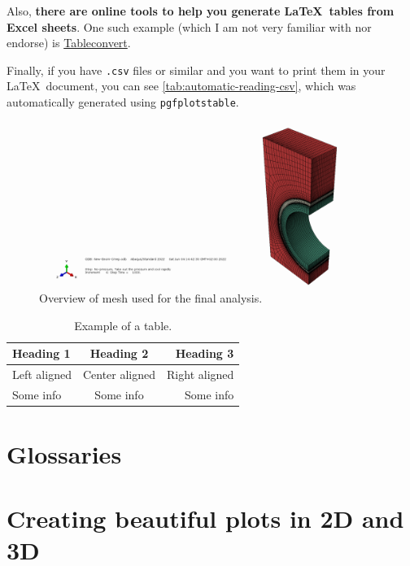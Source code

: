 \begin{description}
	Also, \textbf{there are online tools to help you generate \LaTeX\ tables from Excel sheets}. One such example (which I am not very familiar with nor endorse) is \href{https://tableconvert.com/excel-to-latex}{Tableconvert}.

	Finally, if you have \texttt{.csv} files or similar and you want to print them in your \LaTeX\ document, you can see \cref{tab:automatic-reading-csv}, which was automatically generated using \verb|pgfplotstable|.
\end{description}

\begin{figure}[h]
	\centering %
	\includegraphics[keepaspectratio, trim = 1050 12 150 30, clip, width=0.5\linewidth, height=0.3\textheight]{Images/monoblock-material-overview-mesh.png}
	\caption[Overview of  mesh used for the final analysis.]{Overview of  mesh used for the final analysis.}
	\label{fig:monoblock-overview-mesh}
\end{figure}

\begin{table}[h]
	\centering %
	\begin{tabular}{lcr}
	  \toprule
	  Heading 1 & Heading 2 & Heading 3 \\
	  \midrule
	  Left aligned & Center aligned & Right aligned \\
	  \cmidrule{2-3} %
	  Some info & Some info & Some info \\
	  \bottomrule
	\end{tabular}
	\caption{Example of a table.}
	\label{tab:example-table}
\end{table}

\section{Glossaries}\label{sec:glossaries}

\section{Creating beautiful plots in 2D and 3D}


